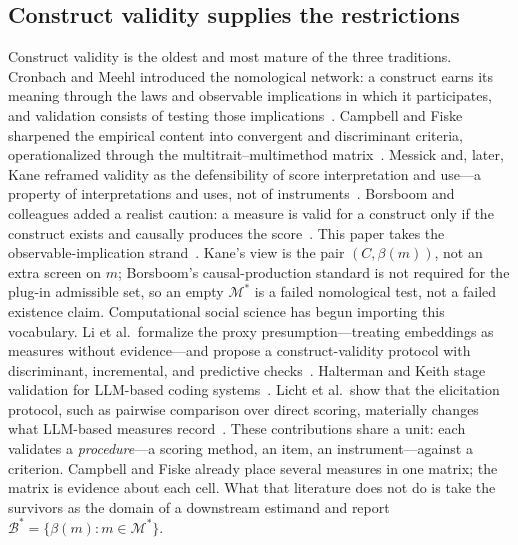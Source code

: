 \documentclass[10pt,letterpaper]{article}
\newcommand{\M}{\ensuremath{\mathcal{M}}}
\newcommand{\Bset}{\mathcal{B}}
\begin{document}
\subsection{Construct validity supplies the restrictions}
Construct validity is the oldest and most mature of the three traditions.
Cronbach and Meehl introduced the nomological network: a construct earns its meaning through the laws and observable implications in which it participates, and validation consists of testing those implications~\cite{cronbach1955}.
Campbell and Fiske sharpened the empirical content into convergent and discriminant criteria, operationalized through the multitrait--multimethod matrix~\cite{campbell1959}.
Messick and, later, Kane reframed validity as the defensibility of score interpretation and use---a property of interpretations and uses, not of instruments~\cite{messick1995,kane2013}.
Borsboom and colleagues added a realist caution: a measure is valid for a construct only if the construct exists and causally produces the score~\cite{borsboom2004}.
This paper takes the observable-implication strand~\cite{cronbach1955,campbell1959}.
Kane's view is the pair $(C,\beta(m))$, not an extra screen on $m$; Borsboom's causal-production standard is not required for the plug-in admissible set, so an empty $\M^*$ is a failed nomological test, not a failed existence claim.
Computational social science has begun importing this vocabulary.
Li et al.~formalize the proxy presumption---treating embeddings as measures without evidence---and propose a construct-validity protocol with discriminant, incremental, and predictive checks~\cite{proxy2026}.
Halterman and Keith stage validation for LLM-based coding systems~\cite{halterman2026}.
Licht et al.~show that the elicitation protocol, such as pairwise comparison over direct scoring, materially changes what LLM-based measures record~\cite{licht2025}.
These contributions share a unit: each validates a \emph{procedure}---a scoring method, an item, an instrument---against a criterion.
Campbell and Fiske already place several measures in one matrix; the matrix is evidence about each cell.
What that literature does not do is take the survivors as the domain of a downstream estimand and report $\Bset^*=\{\beta(m):m\in\M^*\}$.
\end{document}
